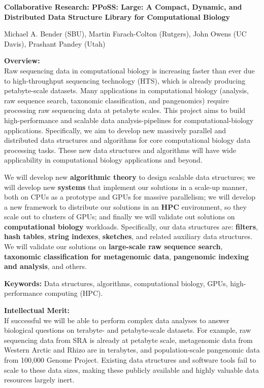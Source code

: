 
\begin{center}
\bf
\Large
Collaborative Research: PPoSS\@: Large: A Compact, Dynamic, and Distributed Data
Structure Library for Computational Biology

\medskip
\small
Michael A. Bender (SBU), Martin Farach-Colton (Rutgers), John Owens (UC Davis),
Prashant Pandey (Utah)
\end{center}


\noindent \textbf{\large Overview:}\\
Raw sequencing data in computational biology is increasing faster than ever due to high-throughput sequencing technology (HTS), which is already producing petabyte-scale datasets. Many applications in computational biology (\kmer analysis, raw sequence search, taxonomic classification, and pangenomics) require processing raw sequencing data at petabyte scales. This project aims to build high-performance and scalable data analysis-pipelines for computational-biology applications. Specifically, we aim to develop new massively parallel and distributed data structures and algorithms for core computational biology data processing tasks. These new data structures and algorithms will have wide applicability in computational biology applications and beyond.

We will develop new \textbf{algorithmic theory} to design scalable data structures; we will develop new \textbf{systems} that implement our solutions in a scale-up manner,  both on CPUs as a prototype and GPUs for massive parallelism; we will develop a new framework to distribute our solutions in an \textbf{HPC} environment, so they  scale out to clusters of GPUs; and finally we will validate out solutions on \textbf{computational biology} workloads.
%
Specifically, our data structures are: \textbf{filters}, \textbf{hash tables}, \textbf{string indexes}, \textbf{sketches}, and related auxiliary data structures.  We will validate our solutions on \textbf{large-scale raw sequence search}, \textbf{taxonomic classification for metagenomic data}, \textbf{pangenomic indexing and analysis}, and others.


\noindent \textbf{\large Keywords:} Data structures, algorithms, computational biology, GPUs, high-performance computing (HPC).

\noindent \textbf{\large Intellectual Merit:}\\
If successful we will be able to perform complex data analyses to answer biological questions on terabyte- and petabyte-scale datasets. For example, raw sequencing data from SRA  is already at petabyte scale, metagenomic data from Western Arctic and Rhizo are in terabytes, and population-scale pangenomic data from 100,000 Genome Project. Existing data structures and software tools fail to scale to these data sizes, making these publicly available and highly valuable data resources largely inert.

